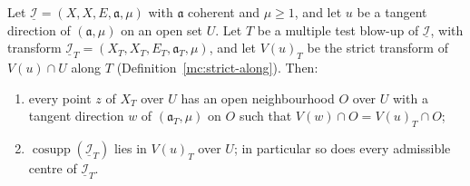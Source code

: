 \begin{theorem}
\label{mc:giraud-tower}
\leanok
Let \(\underline{\mathcal I}=(X,X,E,\mathfrak a,\mu)\) with \(\mathfrak a\) coherent and \(\mu\ge1\), and let \(u\) be a tangent direction of
\((\mathfrak a,\mu)\) on an open set \(U\). Let \(T\) be a multiple test blow-up of \(\underline{\mathcal I}\), with transform
\(\underline{\mathcal I}_T=(X_T,X_T,E_T,\mathfrak a_T,\mu)\), and let \(V(u)_T\) be the strict transform of \(V(u)\cap U\) along \(T\)
(Definition~\ref{mc:strict-along}). Then:
\begin{enumerate}
\item every point \(z\) of \(X_T\) over \(U\) has an open neighbourhood \(O\) over \(U\) with a tangent direction \(w\) of \((\mathfrak a_T,\mu)\) on
\(O\) such that \(V(w)\cap O=V(u)_T\cap O\);
\item \(\operatorname{cosupp}(\underline{\mathcal I}_T)\) lies in \(V(u)_T\) over \(U\); in particular so does every admissible centre of
\(\underline{\mathcal I}_T\).
\end{enumerate}
\end{theorem}
